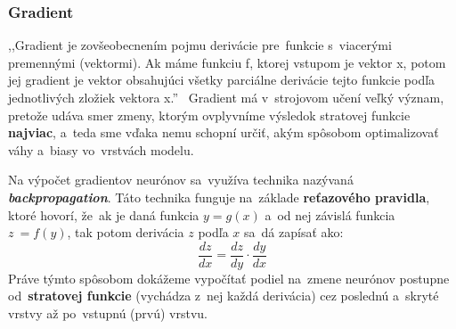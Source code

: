 \subsubsection{Gradient}
,,Gradient je zovšeobecnením pojmu derivácie pre~funkcie s~viacerými premennými (vektormi). Ak máme funkciu f, ktorej vstupom je vektor x, potom jej gradient je vektor obsahujúci všetky parciálne derivácie tejto funkcie podľa jednotlivých zložiek vektora x.''~\cite{Goodfellow-et-al-2016} Gradient má v~strojovom učení veľký význam, pretože udáva smer zmeny, ktorým ovplyvníme výsledok stratovej funkcie \textbf{najviac}, a~teda sme vďaka nemu schopní určiť, akým spôsobom optimalizovať váhy a~biasy vo~vrstvách modelu. 

Na výpočet gradientov neurónov sa~využíva technika nazývaná \textbf{\textit{backpropagation}}\label{th:backpropagation}. Táto technika funguje na~základe \textbf{reťazového pravidla}, ktoré hovorí, že~ak je daná funkcia $ y = g(x) $ a~od nej závislá funkcia $ z~= f(y) $, tak potom derivácia $z$ podľa $x$ sa~dá zapísať ako:
\begin{equation}
    \frac{dz}{dx} = \frac{dz}{dy} \cdot \frac{dy}{dx}
\end{equation}
Práve týmto spôsobom dokážeme vypočítať podiel na~zmene neurónov postupne od~\textbf{stratovej funkcie} (vychádza z~nej každá derivácia) cez poslednú a~skryté vrstvy až po~vstupnú (prvú) vrstvu. 

